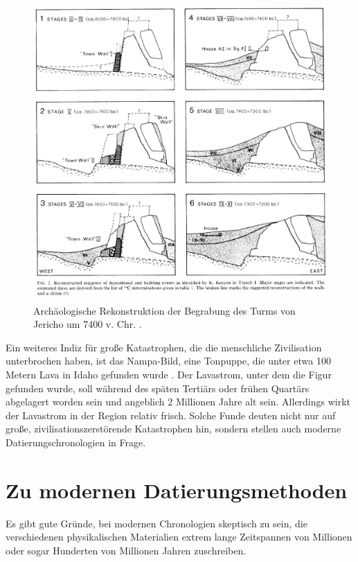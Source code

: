 \documentclass[10pt,twocolumn,letterpaper]{article}
\begin{document}
\begin{figure}[t]
\begin{center}
   \includegraphics[width=1\linewidth]{jericho.jpg}
\end{center}
   \caption{Archäologische Rekonstruktion der Begrabung des Turms von Jericho um 7400 v. Chr. \cite{95}.}
\label{fig:14}
\label{fig:onecol}
\end{figure}

Ein weiteres Indiz für große Katastrophen, die die menschliche Zivilisation unterbrochen haben, ist das Nampa-Bild, eine Tonpuppe, die unter etwa 100 Metern Lava in Idaho gefunden wurde \cite{102,103}. Der Lavastrom, unter dem die Figur gefunden wurde, soll während des späten Tertiärs oder frühen Quartärs abgelagert worden sein und angeblich 2 Millionen Jahre alt sein. Allerdings wirkt der Lavastrom in der Region relativ frisch. Solche Funde deuten nicht nur auf große, zivilisationszerstörende Katastrophen hin, sondern stellen auch moderne Datierungschronologien in Frage.

\section{Zu modernen Datierungsmethoden}

Es gibt gute Gründe, bei modernen Chronologien skeptisch zu sein, die verschiedenen physikalischen Materialien extrem lange Zeitspannen von Millionen oder sogar Hunderten von Millionen Jahren zuschreiben.
\end{document}
